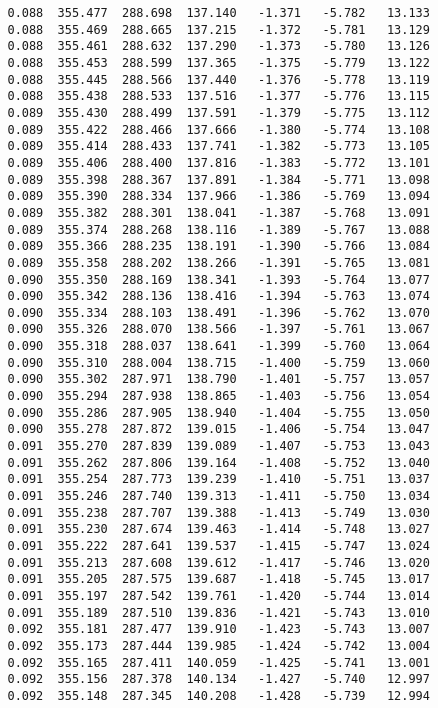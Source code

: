 \begin{verbatim}
   0.088  355.477  288.698  137.140   -1.371   -5.782   13.133
   0.088  355.469  288.665  137.215   -1.372   -5.781   13.129
   0.088  355.461  288.632  137.290   -1.373   -5.780   13.126
   0.088  355.453  288.599  137.365   -1.375   -5.779   13.122
   0.088  355.445  288.566  137.440   -1.376   -5.778   13.119
   0.088  355.438  288.533  137.516   -1.377   -5.776   13.115
   0.089  355.430  288.499  137.591   -1.379   -5.775   13.112
   0.089  355.422  288.466  137.666   -1.380   -5.774   13.108
   0.089  355.414  288.433  137.741   -1.382   -5.773   13.105
   0.089  355.406  288.400  137.816   -1.383   -5.772   13.101
   0.089  355.398  288.367  137.891   -1.384   -5.771   13.098
   0.089  355.390  288.334  137.966   -1.386   -5.769   13.094
   0.089  355.382  288.301  138.041   -1.387   -5.768   13.091
   0.089  355.374  288.268  138.116   -1.389   -5.767   13.088
   0.089  355.366  288.235  138.191   -1.390   -5.766   13.084
   0.089  355.358  288.202  138.266   -1.391   -5.765   13.081
   0.090  355.350  288.169  138.341   -1.393   -5.764   13.077
   0.090  355.342  288.136  138.416   -1.394   -5.763   13.074
   0.090  355.334  288.103  138.491   -1.396   -5.762   13.070
   0.090  355.326  288.070  138.566   -1.397   -5.761   13.067
   0.090  355.318  288.037  138.641   -1.399   -5.760   13.064
   0.090  355.310  288.004  138.715   -1.400   -5.759   13.060
   0.090  355.302  287.971  138.790   -1.401   -5.757   13.057
   0.090  355.294  287.938  138.865   -1.403   -5.756   13.054
   0.090  355.286  287.905  138.940   -1.404   -5.755   13.050
   0.090  355.278  287.872  139.015   -1.406   -5.754   13.047
   0.091  355.270  287.839  139.089   -1.407   -5.753   13.043
   0.091  355.262  287.806  139.164   -1.408   -5.752   13.040
   0.091  355.254  287.773  139.239   -1.410   -5.751   13.037
   0.091  355.246  287.740  139.313   -1.411   -5.750   13.034
   0.091  355.238  287.707  139.388   -1.413   -5.749   13.030
   0.091  355.230  287.674  139.463   -1.414   -5.748   13.027
   0.091  355.222  287.641  139.537   -1.415   -5.747   13.024
   0.091  355.213  287.608  139.612   -1.417   -5.746   13.020
   0.091  355.205  287.575  139.687   -1.418   -5.745   13.017
   0.091  355.197  287.542  139.761   -1.420   -5.744   13.014
   0.091  355.189  287.510  139.836   -1.421   -5.743   13.010
   0.092  355.181  287.477  139.910   -1.423   -5.743   13.007
   0.092  355.173  287.444  139.985   -1.424   -5.742   13.004
   0.092  355.165  287.411  140.059   -1.425   -5.741   13.001
   0.092  355.156  287.378  140.134   -1.427   -5.740   12.997
   0.092  355.148  287.345  140.208   -1.428   -5.739   12.994

\end{verbatim}

